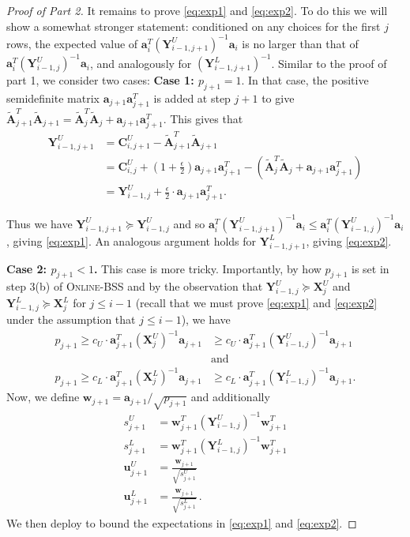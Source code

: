 \documentclass{toc}
\newcommand{\bv}[1]{\mathbf{#1}}
\begin{document}
\begin{proof}[Proof of  Part 2]
It remains to prove \eqref{eq:exp1} and \eqref{eq:exp2}.
To do this we will show a somewhat stronger statement: conditioned on any choices for the first $j$ rows, the expected value of $\bv{a}_i^T (\bv{Y}^U_{i-1,j+1})^{-1} \bv{a}_i$ is no larger than that of $\bv{a}_i^T (\bv{Y}^U_{i-1,j})^{-1} \bv{a}_i$, and analogously for $(\bv{Y}^L_{i-1,j+1})^{-1}$.
Similar to the proof of part 1, we consider two cases:
\textbf{Case 1: $p_{j+1} = 1$}.  In that case, the positive semidefinite matrix $\bv{a}_{j+1} \bv{a}_{j+1}^T$ is added at step $j+1$ to give $\bv{\tilde A}_{j+1}^T \bv{\tilde A}_{j+1} = \bv{\tilde A}_{j}^T \bv{\tilde A}_{j} + \bv{a}_{j+1} \bv{a}_{j+1}^T.$ This gives that 
\begin{align*}
\bv{Y}^U_{i-1,j+1} &= \bv{C}_{i,j+1}^U - \bv{\tilde A}_{j+1}^T \bv{\tilde A}_{j+1}\\
 &= \bv{C}_{i,j}^U + \left (1 + \frac{\epsilon}{2} \right ) \bv{a}_{j+1} \bv{a}_{j+1}^T - (\bv{\tilde A}_{j}^T \bv{\tilde A}_{j}  +\bv{a}_{j+1} \bv{a}_{j+1}^T)\\
 & = \bv{Y}^U_{i-1,j}  +  \frac{\epsilon}{2} \cdot \bv{a}_{j+1} \bv{a}_{j+1}^T.
\end{align*}

Thus we have $\bv{Y}^U_{i-1,j+1} \succeq \bv{Y}^U_{i-1,j}$ and so $\bv{a}_i^T (\bv{Y}^U_{i-1,j+1})^{-1} \bv{a}_i \le \bv{a}_i^T (\bv{Y}^U_{i-1,j})^{-1} \bv{a}_i$, giving \eqref{eq:exp1}. An analogous argument holds for $\bv{Y}^L_{i-1,j+1}$, giving \eqref{eq:exp2}. 

%

\textbf{Case 2: $p_{j+1} < 1$.} This case is more tricky.  %
Importantly, by how $p_{j+1}$ is set in step 3(b) of \textsc{Online-BSS} and by the observation that $\bv{Y}^U_{i-1,j} \succeq \bv{X}^U_j$ and $\bv{Y}^L_{i-1,j} \succeq \bv{X}^L_j$ for $j \le i-1$ (recall that we must prove \eqref{eq:exp1} and \eqref{eq:exp2} under the assumption that $j \le i-1$), 
we have %
\begin{align}
p_{j+1} \geq c_U \cdot \bv{a}_{j+1}^T (\bv{X}^U_j)^{-1} \bv{a}_{j+1} &\geq c_U \cdot  \bv{a}_{j+1}^T (\bv{Y}^U_{i-1,j})^{-1} \bv{a}_{j+1} \label{eq:cuBound}\\
&\text{and}\nonumber\\
p_{j+1} \geq c_L \cdot \bv{a}_{j+1}^T (\bv{X}^L_j)^{-1} \bv{a}_{j+1} &\geq c_L\cdot \bv{a}_{j+1}^T (\bv{Y}^L_{i-1,j})^{-1} \bv{a}_{j+1}\label{eq:clBound}.
\end{align}
%
%
%
%
%
%
Now, we define $\bv{w}_{j+1} ={\bv{a}_{j+1}}/{\sqrt{p_{j+1}}}$ and additionally
\begin{align*}
s^U_{j+1} &= \bv{w}_{j+1}^T (\bv{Y}^U_{i-1,j})^{-1} \bv{w}_{j+1}^T \\
s^L_{j+1} &= \bv{w}_{j+1}^T (\bv{Y}^L_{i-1,j})^{-1} \bv{w}_{j+1}^T \\
\bv{u}^U_{j+1} &= \frac{\bv{w}_{j+1}}{\sqrt{s^U_{j+1}}} \\
\bv{u}^L_{j+1} &= \frac{\bv{w}_{j+1}}{\sqrt{s^L_{j+1}}}\,.
\end{align*}
We then deploy  to bound the expectations in \eqref{eq:exp1} and \eqref{eq:exp2}.  


\end{proof}
\end{document}
